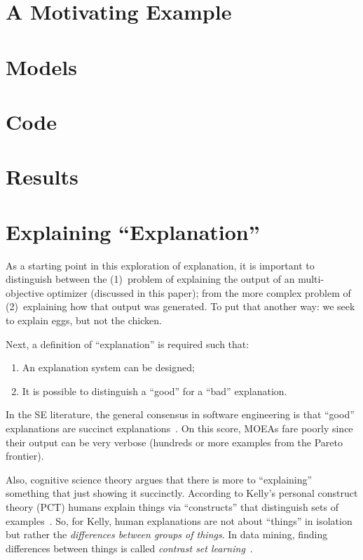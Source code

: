\documentclass[runningheads]{llncs}
\newcommand{\be}{\begin{enumerate}}
\newcommand{\ee}{\end{enumerate}}
\begin{document}
\section{A Motivating Example}


\section{Models}


\section{Code}


\section{Results}


\section{Explaining ``Explanation''}
As a starting point in this exploration of explanation,
it is important to distinguish between the
(1)~problem of explaining the output of an
multi-objective optimizer (discussed in this paper);
from the more complex problem of (2)~explaining how
that output was generated.  To put that another way:
we seek to explain eggs, but not
the chicken.

Next, a definition of  ``explanation'' is required such that:
\be
\item An explanation system can be designed;
\item It is possible to distinguish a  ``good'' for a ``bad'' explanation.
\ee
In the SE literature,
the general consensus in
software engineering is that ``good'' explanations
are succinct explanations~\cite{ag98,dej13z,fenton99}.
On this score, MOEAs fare poorly since their output can be very verbose
(hundreds or more examples from the Pareto frontier).


Also, cognitive science theory argues that
there is more to ``explaining'' something that just
showing it succinctly. According to Kelly's personal
construct theory (PCT) humans explain things via
``constructs'' that distinguish sets of examples~\cite{kelly55}.
So, for Kelly, human explanations are not about
``things'' in isolation but rather the {\em
differences between groups of things}. In data mining, finding
differences between things is called {\em contrast set learning}~\cite{webb09}.
\end{document}
